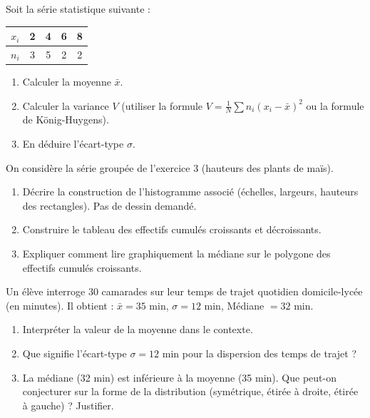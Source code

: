 \documentclass[11pt]{article}
\begin{document}
\begin{exercice}
Soit la série statistique suivante :
\begin{center}
\begin{tabular}{|c|c|c|c|c|}
\hline
$x_i$ & 2 & 4 & 6 & 8 \\ \hline
$n_i$ & 3 & 5 & 2 & 2 \\ \hline
\end{tabular}
\end{center}
\begin{enumerate}
    \item Calculer la moyenne $\bar{x}$.
    \item Calculer la variance $V$ (utiliser la formule $V = \frac{1}{N}\sum n_i(x_i - \bar{x})^2$ ou la formule de König-Huygens).
    \item En déduire l'écart-type $\sigma$.
\end{enumerate}
\end{exercice}

\begin{exercice}
On considère la série groupée de l'exercice 3 (hauteurs des plants de maïs).
\begin{enumerate}
    \item Décrire la construction de l'histogramme associé (échelles, largeurs, hauteurs des rectangles). Pas de dessin demandé.
    \item Construire le tableau des effectifs cumulés croissants et décroissants.
    \item Expliquer comment lire graphiquement la médiane sur le polygone des effectifs cumulés croissants.
\end{enumerate}
\end{exercice}

\begin{exercice}
Un élève interroge 30 camarades sur leur temps de trajet quotidien domicile-lycée (en minutes). Il obtient : $\bar{x} = 35$ min, $\sigma = 12$ min, Médiane $= 32$ min.
\begin{enumerate}
    \item Interpréter la valeur de la moyenne dans le contexte.
    \item Que signifie l'écart-type $\sigma = 12$ min pour la dispersion des temps de trajet ?
    \item La médiane (32 min) est inférieure à la moyenne (35 min). Que peut-on conjecturer sur la forme de la distribution (symétrique, étirée à droite, étirée à gauche) ? Justifier.
\end{enumerate}
\end{exercice}
\end{document}
